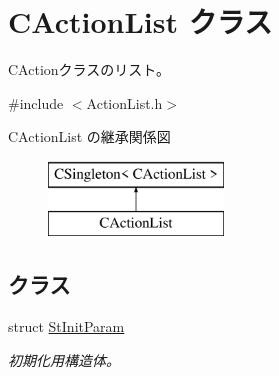\hypertarget{class_c_action_list}{}\section{C\+Action\+List クラス}
\label{class_c_action_list}


C\+Actionクラスのリスト。  




{\ttfamily \#include $<$Action\+List.\+h$>$}

C\+Action\+List の継承関係図\begin{figure}[H]
\begin{center}
\leavevmode
\includegraphics[height=2.000000cm]{class_c_action_list}
\end{center}
\end{figure}
\subsection*{クラス}
\begin{DoxyCompactItemize}
\item 
struct \hyperlink{struct_c_action_list_1_1_st_init_param}{St\+Init\+Param}
\begin{DoxyCompactList}\small\item\em 初期化用構造体。 \end{DoxyCompactList}\end{DoxyCompactItemize}
